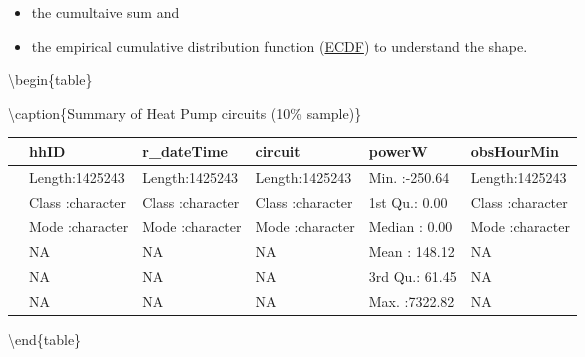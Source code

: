 \documentclass[]{article}
\providecommand{\tightlist}{%
  \setlength{\itemsep}{0pt}\setlength{\parskip}{0pt}}
\begin{document}
\begin{itemize}
\tightlist
\item
  the cumultaive sum and
\item
  the empirical cumulative distribution function
  (\href{http://ggplot2.tidyverse.org/reference/stat_ecdf.html}{ECDF})
  to understand the shape.
\end{itemize}

\textbackslash{}begin\{table\}

\textbackslash{}caption\{\label{tab:cum sum}Summary of Heat Pump
circuits (10\% sample)\} \centering

\begin{tabular}[t]{l|l|l|l|l|l}
\hline
  &     hhID &  r\_dateTime &   circuit &     powerW &  obsHourMin\\
\hline
 & Length:1425243 & Length:1425243 & Length:1425243 & Min.   :-250.64 & Length:1425243\\
\hline
 & Class :character & Class :character & Class :character & 1st Qu.:   0.00 & Class :character\\
\hline
 & Mode  :character & Mode  :character & Mode  :character & Median :   0.00 & Mode  :character\\
\hline
 & NA & NA & NA & Mean   : 148.12 & NA\\
\hline
 & NA & NA & NA & 3rd Qu.:  61.45 & NA\\
\hline
 & NA & NA & NA & Max.   :7322.82 & NA\\
\hline
\end{tabular}

\textbackslash{}end\{table\}
\end{document}
